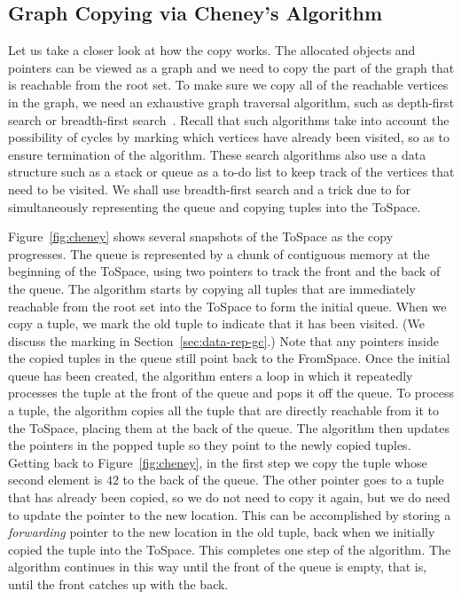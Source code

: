 \documentclass[11pt]{book}
\begin{document}
\subsection{Graph Copying via Cheney's Algorithm}
\label{sec:cheney}

Let us take a closer look at how the copy works. The allocated objects
and pointers can be viewed as a graph and we need to copy the part of
the graph that is reachable from the root set. To make sure we copy
all of the reachable vertices in the graph, we need an exhaustive
graph traversal algorithm, such as depth-first search or breadth-first
search~\citep{Moore:1959aa,Cormen:2001uq}. Recall that such algorithms
take into account the possibility of cycles by marking which vertices
have already been visited, so as to ensure termination of the
algorithm. These search algorithms also use a data structure such as a
stack or queue as a to-do list to keep track of the vertices that need
to be visited. We shall use breadth-first search and a trick due to
\citet{Cheney:1970aa} for simultaneously representing the queue and
copying tuples into the ToSpace.

Figure~\ref{fig:cheney} shows several snapshots of the ToSpace as the
copy progresses. The queue is represented by a chunk of contiguous
memory at the beginning of the ToSpace, using two pointers to track
the front and the back of the queue. The algorithm starts by copying
all tuples that are immediately reachable from the root set into the
ToSpace to form the initial queue.  When we copy a tuple, we mark the
old tuple to indicate that it has been visited. (We discuss the
marking in Section~\ref{sec:data-rep-gc}.) Note that any pointers
inside the copied tuples in the queue still point back to the
FromSpace. Once the initial queue has been created, the algorithm
enters a loop in which it repeatedly processes the tuple at the front
of the queue and pops it off the queue.  To process a tuple, the
algorithm copies all the tuple that are directly reachable from it to
the ToSpace, placing them at the back of the queue. The algorithm then
updates the pointers in the popped tuple so they point to the newly
copied tuples. Getting back to Figure~\ref{fig:cheney}, in the first
step we copy the tuple whose second element is $42$ to the back of the
queue. The other pointer goes to a tuple that has already been copied,
so we do not need to copy it again, but we do need to update the
pointer to the new location. This can be accomplished by storing a
\emph{forwarding} pointer to the new location in the old tuple, back
when we initially copied the tuple into the ToSpace. This completes
one step of the algorithm. The algorithm continues in this way until
the front of the queue is empty, that is, until the front catches up
with the back.
\end{document}
